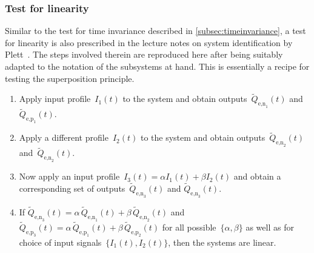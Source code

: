 \subsubsection*{Test for linearity}
Similar     to      the     test      for     time      invariance     described
in \cref{subsec:timeinvariance}, a  test for linearity is  also prescribed in
the lecture notes on  system identification by Plett~\cite{PlettECE5560_02}. The
steps involved therein  are reproduced here after being suitably  adapted to the
notation of the subsystems at hand. This is essentially a recipe for testing the
superposition principle.
\begin{enumerate}
    \item Apply input profile~$I_1(t)$ to the system and obtain outputs~$\widetilde{Q}_{\text{e,n}_1}\!(t)$ and~$\widetilde{Q}_{\text{e,p}_1}\!(t)$.
    \item Apply a different profile~$I_2(t)$ to the system and obtain outputs~$\widetilde{Q}_{\text{e,n}_2}\!(t)$ and~$\widetilde{Q}_{\text{e,n}_2}\!(t)$.
    \item Now apply an input profile~$I_3(t) = \alpha I_1(t) + \beta I_2(t)$ and obtain a corresponding set of outputs~$\widetilde{Q}_{\text{e,n}_3}\!(t)$ and $\widetilde{Q}_{\text{e,n}_3}\!(t)$.
    \item If ${\widetilde{Q}_{\text{e,n}_3}\!(t) = \alpha\,
            \widetilde{Q}_{\text{e,n}_1}\!(t) + \beta \,
            \widetilde{Q}_{\text{e,n}_2}\!(t)}$ and
            ${\widetilde{Q}_{\text{e,p}_3}\!(t) = \alpha\,
                \widetilde{Q}_{\text{e,p}_1}\!(t) + \beta \,
            \widetilde{Q}_{\text{e,p}_2}\!(t)}$ for all possible~$\{\alpha,\beta\}$ as well as for choice of input signals~$\{I_1(t),I_2(t)\}$, then the systems are linear.
\end{enumerate}

